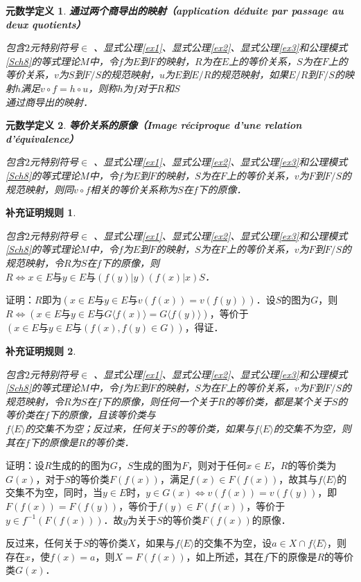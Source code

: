 \documentclass[12pt, a4paper, oneside]{book}
\newtheorem{metadef}{元数学定义}
\newtheorem{Ccor}{补充证明规则}
\begin{document}
			\begin{metadef}
				\textbf{通过两个商导出的映射（application déduite par passage au deux quotients）}
				\par
				包含$2$元特别符号$\in$ 、显式公理\ref{ex1}、显式公理\ref{ex2}、显式公理\ref{ex3}和公理模式\ref{Sch8}的等式理论$M$中，令$f$为$E$到$F$的映射，$R$为在$E$上的等价关系，$S$为在$F$上的等价关系，$v$为$S$到$F/S$的规范映射，$u$为$E$到$E/R$的规范映射，如果$E/R$到$F/S$的映射$h$满足$v\circ f=h\circ u$，则称$h$为$f$对于$R$和$S$\\通过商导出的映射．
			\end{metadef}

			\begin{metadef}
				\textbf{等价关系的原像（Image réciproque d'une relation d'équivalence）}
				\par
				包含$2$元特别符号$\in$ 、显式公理\ref{ex1}、显式公理\ref{ex2}、显式公理\ref{ex3}和公理模式\ref{Sch8}的等式理论$M$中，令$f$为$E$到$F$的映射，$S$为在$F$上的等价关系，$v$为$F$到$F/S$的规范映射，则同$v\circ f$相关的等价关系称为$S$在$f$下的原像．
			\end{metadef}

			\begin{Ccor}\label{Ccor50}
				\hfill\par
				包含$2$元特别符号$\in$ 、显式公理\ref{ex1}、显式公理\ref{ex2}、显式公理\ref{ex3}和公理模式\ref{Sch8}的等式理论$M$中，令$f$为$E$到$F$的映射，$S$为在$F$上的等价关系，$v$为$F$到$F/S$的规范映射，令$R$为$S$在$f$下的原像，则$R\Leftrightarrow x\in E\text{与}y\in E\text{与}(f(y)|y)(f(x)|x)S$．
			\end{Ccor}
			证明：$R$即为$(x\in E\text{与}y\in E\text{与}v(f(x))=v(f(y)))$．设$S$的图为$G$，则$R\Leftrightarrow (x\in E\text{与}y\in E\text{与}G\langle f(x)\rangle=G\langle f(y)\rangle)$，等价于$(x\in E\text{与}y\in E\text{与}(f(x), f(y)\in G))$，得证．
			
			\begin{Ccor}\label{Ccor51}
				\hfill\par
				包含$2$元特别符号$\in$ 、显式公理\ref{ex1}、显式公理\ref{ex2}、显式公理\ref{ex3}和公理模式\ref{Sch8}的等式理论$M$中，令$f$为$E$到$F$的映射，$S$为在$F$上的等价关系，$v$为$F$到$F/S$的规范映射，令$R$为$S$在$f$下的原像，则任何一个关于$R$的等价类，都是某个关于$S$的等价类在$f$下的原像，且该等价类与\\$f\langle E \rangle $的交集不为空；反过来，任何关于$S$的等价类，如果与$f\langle E \rangle $的交集不为空，则其在$f$下的原像是$R$的等价类．
			\end{Ccor}
			证明：设$R$生成的的图为$G$，$S$生成的图为$F$，则对于任何$x\in E$，$R$的等价类为$G(x)$，对于$S$的等价类$F(f(x))$，满足$f(x)\in F(f(x))$，故其与$f\langle E \rangle $的交集不为空，同时，当$y\in E$时，$y\in G(x)\Leftrightarrow v(f(x))=v(f(y))$，即$F(f(x))= F(f(y))$，等价于$f(y)\in F(f(x))$，等价于$y\in f^{-1}(F(f(x)))$．故$y$为关于$S$的等价类$F(f(x))$的原像．
			\par
			反过来，任何关于$S$的等价类$X$，如果与$f\langle E \rangle$的交集不为空，设$a\in X\cap f\langle E \rangle $，则存在$x$，使$f(x)=a$，则$X=F(f(x))$，如上所述，其在$f$下的原像是$R$的等价类$G(x)$．
\end{document}
